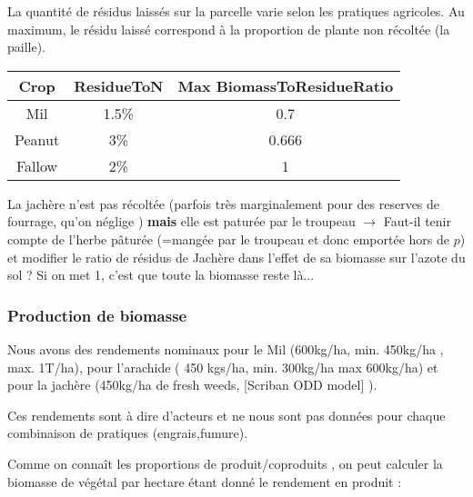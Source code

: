 \documentclass[10pt,a4paper,french]{article} %
\begin{document}
La quantité de résidus laissés sur la parcelle varie selon les pratiques agricoles.
Au maximum, le résidu laissé correspond à la proportion de plante non récoltée (la paille).



\begin{table}[h!]
\begin{tabular}{|c|c|c|}
\hline
\textbf{Crop}          & \textbf{ResidueToN}    & \textbf{Max BiomassToResidueRatio} \\ \hline
Mil                    & 1.5\%                 & 0.7                        \\ \hline
Peanut                 & 3\%                   & 0.666                      \\ \hline
Fallow                 & 2\%                   & 1                          \\ \hline
\end{tabular}
\end{table}



\begin{tcolorbox}[noparskip,
    colback=LightGreen,colframe=DarkGreen,%
    colbacklower=LimeGreen!75!LightGreen,%
    title=Question]

La jachère n'est pas récoltée (parfois très marginalement pour des reserves de fourrage, qu'on néglige ) \textbf{mais} elle est paturée par le troupeau $\rightarrow$ Faut-il  tenir compte de l'herbe pâturée (=mangée par le troupeau et donc emportée hors de $p$) et modifier le ratio de résidus de Jachère dans l'effet de sa biomasse sur l'azote du sol ?  Si on met 1, c'est que toute la biomasse reste là... \\
\end{tcolorbox}




\subsubsection{Production de biomasse}


Nous avons des rendements nominaux pour le Mil (600kg/ha, min. 450kg/ha , max. 1T/ha), pour l'arachide ( 450 kgs/ha, min. 300kg/ha max 600kg/ha) et pour la jachère (450kg/ha de fresh weeds, [Scriban ODD model] ).

Ces rendements sont à dire d'acteurs et ne nous sont pas données pour chaque combinaison de pratiques (engrais,fumure).

Comme on connaît les proportions de  produit/coproduits , on peut calculer la biomasse de végétal par hectare étant donné le rendement en produit : 
\end{document}
